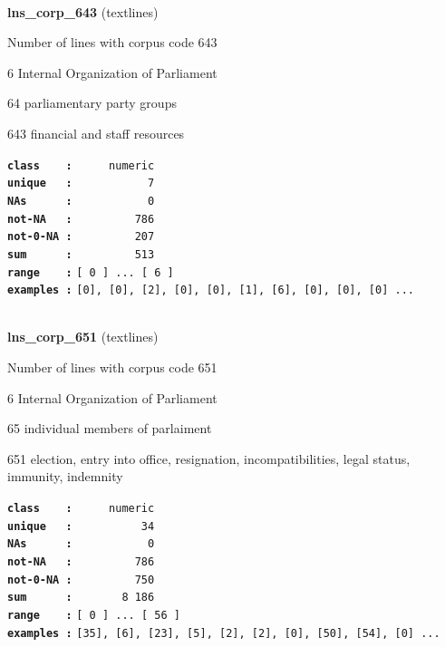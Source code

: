 \documentclass[]{article}
\begin{document}
~

\textbf{lns\_corp\_643} (textlines)

Number of lines with corpus code 643

6 Internal Organization of Parliament

64 parliamentary party groups

643 financial and staff resources

\textbf{\texttt{class\ \ \ \ :}} \texttt{~~~~~numeric}\\
\textbf{\texttt{unique\ \ \ :}} \texttt{~~~~~~~~~~~7}\\
\textbf{\texttt{NAs\ \ \ \ \ \ :}} \texttt{~~~~~~~~~~~0}\\
\textbf{\texttt{not-NA\ \ \ :}} \texttt{~~~~~~~~~786}\\
\textbf{\texttt{not-0-NA\ :}} \texttt{~~~~~~~~~207}\\
\textbf{\texttt{sum\ \ \ \ \ \ :}} \texttt{~~~~~~~~~513}\\
\textbf{\texttt{range\ \ \ \ :}}
\texttt{{[}\ 0\ {]}\ ...\ {[}\ 6\ {]}}\\
\textbf{\texttt{examples\ :}}
\texttt{{[}0{]},\ {[}0{]},\ {[}2{]},\ {[}0{]},\ {[}0{]},\ {[}1{]},\ {[}6{]},\ {[}0{]},\ {[}0{]},\ {[}0{]}\ ...}\\

~

\textbf{lns\_corp\_651} (textlines)

Number of lines with corpus code 651

6 Internal Organization of Parliament

65 individual members of parlaiment

651 election, entry into office, resignation, incompatibilities, legal
status, immunity, indemnity

\textbf{\texttt{class\ \ \ \ :}} \texttt{~~~~~numeric}\\
\textbf{\texttt{unique\ \ \ :}} \texttt{~~~~~~~~~~34}\\
\textbf{\texttt{NAs\ \ \ \ \ \ :}} \texttt{~~~~~~~~~~~0}\\
\textbf{\texttt{not-NA\ \ \ :}} \texttt{~~~~~~~~~786}\\
\textbf{\texttt{not-0-NA\ :}} \texttt{~~~~~~~~~750}\\
\textbf{\texttt{sum\ \ \ \ \ \ :}} \texttt{~~~~~~~8~186}\\
\textbf{\texttt{range\ \ \ \ :}}
\texttt{{[}\ 0\ {]}\ ...\ {[}\ 56\ {]}}\\
\textbf{\texttt{examples\ :}}
\texttt{{[}35{]},\ {[}6{]},\ {[}23{]},\ {[}5{]},\ {[}2{]},\ {[}2{]},\ {[}0{]},\ {[}50{]},\ {[}54{]},\ {[}0{]}\ ...}\\
\end{document}
